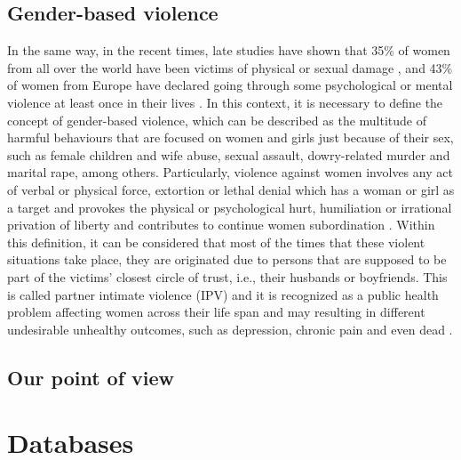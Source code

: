 \subsection{Gender-based violence}

	\textbf{} In the same way, in the recent times, late studies have shown that 35\% of women from all over the world have been victims of physical or sexual damage \cite{WHO2013}, and 43\% of women from Europe have declared going through some psychological or mental violence at least once in their lives \cite{EuropeanUnionAgencyforFundamentalRights2014}. In this context, it is necessary to define the concept of gender-based violence, which can be described as the multitude of harmful behaviours that are focused on women and girls just because of their sex, such as female children and wife abuse, sexual assault, dowry-related murder and marital rape, among others. Particularly, violence against women involves any act of verbal or physical force, extortion or lethal denial which has a woman or girl as a target and provokes the physical or psychological hurt, humiliation or irrational privation of liberty and contributes to continue women subordination \cite{Heise1999}. Within this definition, it can be considered that most of the times that these violent situations take place, they are originated due to persons that are supposed to be part of the victims' closest circle of trust, i.e., their husbands or boyfriends. This is called partner intimate violence (IPV)  and it is recognized as a public health problem affecting women across their life span and may resulting in different undesirable unhealthy outcomes, such as depression, chronic pain and even dead \cite{Beyer2015}.
	
\subsection{Our point of view}

	
	
	
	
	
\section{Databases}


